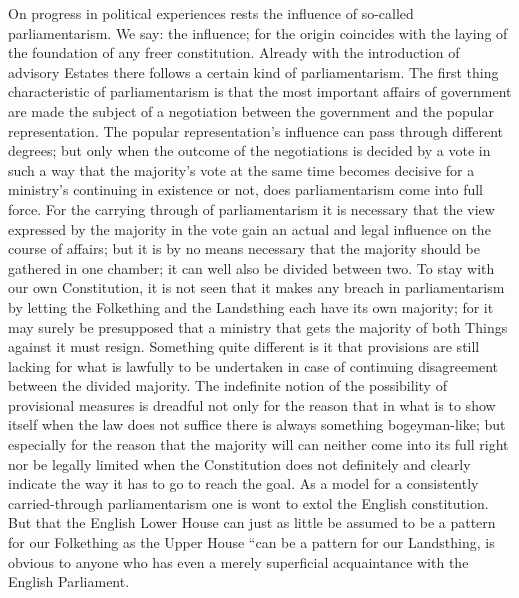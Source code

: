 \documentclass[12pt,a4paper,openany]{book}
\newcommand{\opage}[1]{\marginnote{\footnotesize\textit{[#1]}}}
\begin{document}
On progress in political experiences rests the influence
of so-called parliamentarism. We say:
the influence; for the origin coincides with the laying of the foundation
of any freer constitution.
Already with the introduction of advisory Estates there follows
a certain kind of parliamentarism. The first thing characteristic
of parliamentarism is that the most important
affairs of government are made the subject of a negotiation
between the government and the popular representation. The popular representation's
influence can pass through different
degrees; but only when the outcome of the negotiations is decided
by a vote in such a way that the majority's vote
at the same time becomes decisive for a ministry's continuing
in existence or not, does parliamentarism come into
full force. For the carrying through of parliamentarism it is
necessary that the view expressed by the majority in the vote
gain an actual and legal influence
on the course of affairs; but it is by no means necessary
that the majority should be gathered in one chamber; it can
well also be divided between two. To stay with
our own Constitution, it is not seen that it makes
any breach in parliamentarism by letting the Folkething
and the Landsthing each have its own majority; for it may
surely be presupposed that a ministry that gets the majority of both
Things against it must resign. Something quite
different is it that provisions are still lacking for
what is lawfully to be undertaken in case of continuing
disagreement between the divided majority. The indefinite
notion of the possibility of provisional measures
is dreadful not only for the reason that in
\setcounter{footnote}{0}%
\opage{50}what is to show itself when the law does not suffice
there is always something bogeyman-like; but especially for the
reason that the majority will can neither come into its
full right nor be legally limited when
the Constitution does not definitely and clearly indicate the way
it has to go to reach the goal. As a model
for a consistently carried-through parliamentarism
one is wont to extol the English constitution. But
that the English Lower House can just as little be assumed
to be a pattern for our Folkething as the Upper House
``can be a pattern for our Landsthing, is obvious
to anyone who has even a merely superficial acquaintance
with the English Parliament.
\end{document}
